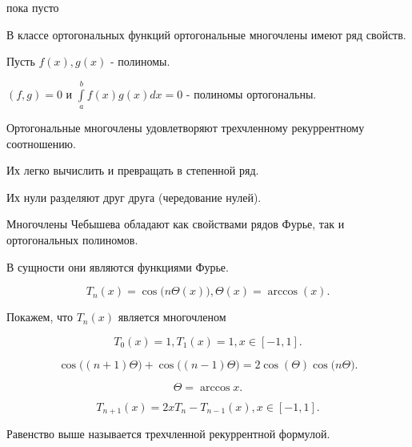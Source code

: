 \begin{col-answer-preambule}
	\begin{plan}
    \item пока пусто
	\end{plan}
\end{col-answer-preambule}


В классе ортогональных функций ортогональные многочлены имеют ряд свойств.

Пусть $f(x), g(x)$ - полиномы.

$(f, g) = 0$ и $\int\limits_a^b f(x) g(x) dx = 0$ - полиномы ортогональны.

\begin{characteristics_}
  \item Ортогональные многочлены удовлетворяют трехчленному рекуррентному соотношению. 
  \item Их легко вычислить и превращать в степенной ряд.
  \item Их нули разделяют друг друга (чередование нулей).
\end{characteristics_}

Многочлены Чебышева обладают как свойствами рядов Фурье, так и ортогональных полиномов.

В сущности они являются функциями Фурье.

\begin{equation*}
  T_n(x) = \cos \Big(n \Theta(x)\Big), \Theta(x) = \arccos(x).
\end{equation*}

Покажем, что $T_n(x)$ является многочленом 

\begin{equation}\label{eq:cheb_2}
  T_0(x) = 1, T_1(x) = 1, x \in [-1, 1].
\end{equation}

\begin{equation*}
  \cos \Big((n+1) \Theta\Big) + \cos \Big((n-1) \Theta\Big) = 2 \cos (\Theta) \cos \Big(n \Theta\Big).
\end{equation*}

\begin{equation*}
  \Theta = \arccos x.
\end{equation*}

\begin{equation}\label{eq:cheb_4}
  T_{n+1}(x) = 2x T_n - T_{n-1}(x), x \in [-1, 1].
\end{equation}

Равенство выше называется трехчленной рекуррентной формулой.

